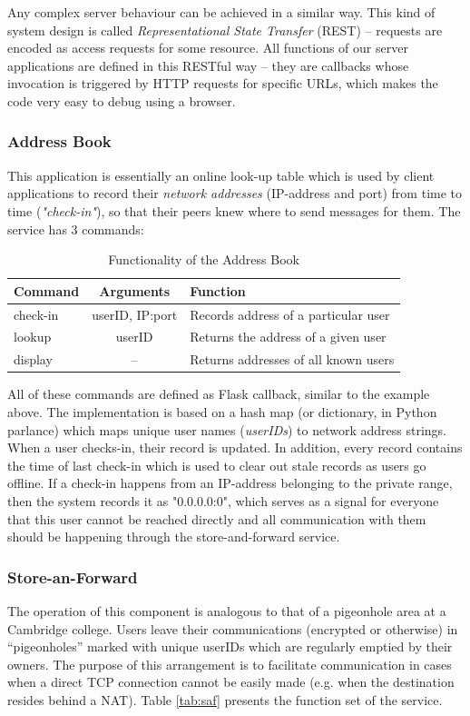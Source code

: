 \documentclass[a4paper, 12pt]{report}
\begin{document}
Any complex server behaviour can be achieved in a similar way. This kind of system design is called \emph{Representational State Transfer} (REST) -- requests are encoded as access requests for some resource.  All functions of our server applications are defined in this RESTful way -- they are callbacks whose invocation is triggered by HTTP requests for specific URLs, which makes the code very easy to debug using a browser.

\subsubsection{Address Book}
This application is essentially an online look-up table which is used by client applications to record their \emph{network addresses} (IP-address and port) from time to time (\emph{"check-in"}), so that their peers knew where to send messages for them. The service has 3 commands:

\begin{table}[H]
\centering
\begin{tabular*}{0.9\textwidth}{l | c | l}
    Command & Arguments & Function \\
    \hline
    check-in & userID, IP:port& Records address of a particular user \\
    lookup & userID & Returns the address of a given user \\
    display & --  & Returns addresses of all known users \\
\end{tabular*}
\caption{\label{tab:address_book} Functionality of the Address Book}
\end{table}

All of these commands are defined as Flask callback, similar to the example above. The implementation is based on a hash map (or dictionary, in Python parlance) which maps unique user names (\emph{userIDs}) to network address strings. When a user checks-in, their record is updated. In addition, every record contains the time of last check-in which is used to clear out stale records as users go offline. If a check-in happens from an IP-address belonging to the private range, then the system records it as "0.0.0.0:0", which serves as a signal for everyone that this user cannot be reached directly and all communication with them should be happening through the store-and-forward service.

\subsubsection{Store-an-Forward}
The operation of this component is analogous to that of a pigeonhole area at a Cambridge college. Users leave their communications (encrypted or otherwise) in ``pigeonholes'' marked with unique userIDs which are regularly emptied by their owners. The purpose of this arrangement is to facilitate communication in cases when a direct TCP connection cannot be easily made (e.g. when the destination resides behind a NAT). Table \ref{tab:saf} presents the function set of the service.
\end{document}
